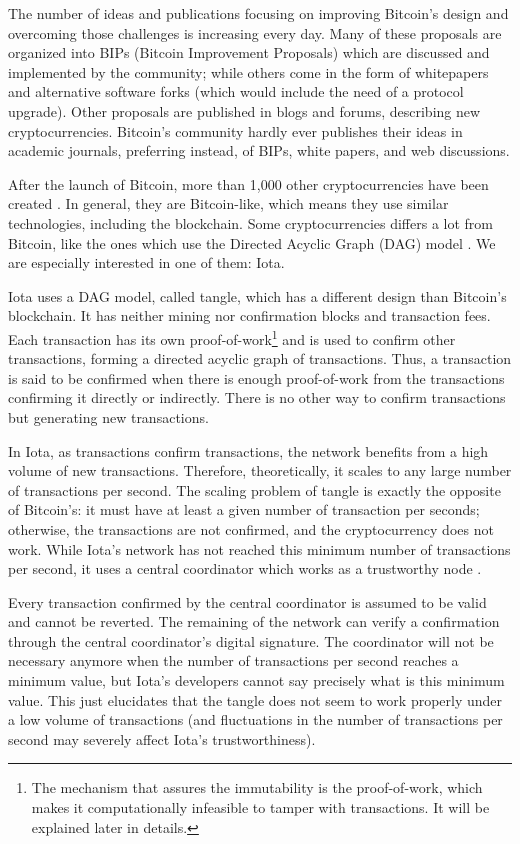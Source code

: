The number of ideas and publications focusing on improving Bitcoin's design and overcoming those challenges is increasing every day. Many of these proposals are organized into BIPs (Bitcoin Improvement Proposals) which are discussed and implemented by the community; while others come in the form of whitepapers and alternative software forks (which would include the need of a protocol upgrade). Other proposals are published in blogs and forums, describing new cryptocurrencies. Bitcoin's community hardly ever publishes their ideas in academic journals, preferring instead, of BIPs, white papers, and web discussions.

After the launch of Bitcoin, more than 1,000 other cryptocurrencies have been created \citep{coinmarketcap}. In general, they are Bitcoin-like, which means they use similar technologies, including the blockchain. Some cryptocurrencies differs a lot from Bitcoin, like the ones which use the Directed Acyclic Graph (DAG) model \citep{dagdiscussion2014, tangle2016, dagcoin2015, sompolinsky2013, lewenberg2015, vorick2015}. We are especially interested in one of them: Iota.

Iota uses a DAG model, called tangle, which has a different design than Bitcoin's blockchain. It has neither mining nor confirmation blocks and transaction fees. Each transaction has its own proof-of-work\footnote{The mechanism that assures the immutability is the proof-of-work, which makes it computationally infeasible to tamper with transactions. It will be explained later in details.} and is used to confirm other transactions, forming a directed acyclic graph of transactions. Thus, a transaction is said to be confirmed when there is enough proof-of-work from the transactions confirming it directly or indirectly. There is no other way to confirm transactions but generating new transactions.

In Iota, as transactions confirm transactions, the network benefits from a high volume of new transactions. Therefore, theoretically, it scales to any large number of transactions per second. The scaling problem of tangle is exactly the opposite of Bitcoin's: it must have at least a given number of transaction per seconds; otherwise, the transactions are not confirmed, and the cryptocurrency does not work. While Iota's network has not reached this minimum number of transactions per second, it uses a central coordinator which works as a trustworthy node \citep{iotacoordinator}.

Every transaction confirmed by the central coordinator is assumed to be valid and cannot be reverted. The remaining of the network can verify a confirmation through the central coordinator's digital signature. The coordinator will not be necessary anymore when the number of transactions per second reaches a minimum value, but Iota's developers cannot say precisely what is this minimum value. This just elucidates that the tangle does not seem to work properly under a low volume of transactions (and fluctuations in the number of transactions per second may severely affect Iota's trustworthiness).


